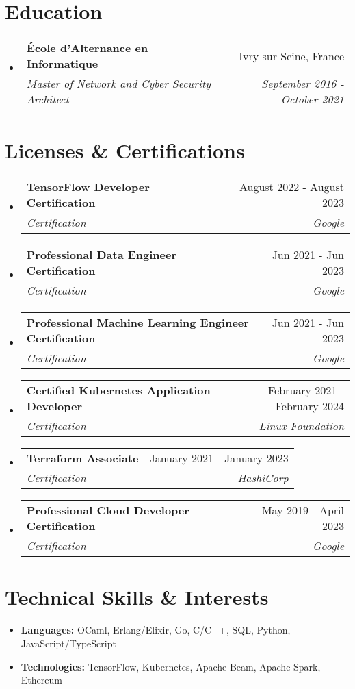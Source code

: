 \documentclass[letterpaper,11pt]{article}
\makeatletter
\newcommand{\resumeItem}[1]{
  \item\small{#1 \vspace{-2pt}}
}
\newcommand{\resumeSubheading}[4]{
  \vspace{-1pt}\item
    \begin{tabular*}{0.97\textwidth}[t]{l@{\extracolsep{\fill}}r}
      \textbf{#1} & #2 \\
      \textit{\small#3} & \textit{\small #4} \\
    \end{tabular*}\vspace{-5pt}
}
\newcommand{\resumeSubHeadingListStart}{\begin{itemize}[leftmargin=*]}
\newcommand{\resumeSubHeadingListEnd}{\end{itemize}}
\makeatother
\begin{document}
\section{Education}
\resumeSubHeadingListStart{}
\resumeSubheading{École d'Alternance en Informatique}
{Ivry-sur-Seine, France}
{Master of Network and Cyber Security Architect}
{September 2016 - October 2021}
\resumeSubHeadingListEnd{}


\section{Licenses \& Certifications}
\resumeSubHeadingListStart{}
\resumeSubheading{TensorFlow Developer Certification}
{August 2022 - August 2023}
{Certification}
{Google}
\resumeSubheading{Professional Data Engineer Certification}
{Jun 2021 - Jun 2023}
{Certification}
{Google}
\resumeSubheading{Professional Machine Learning Engineer Certification}
{Jun 2021 - Jun 2023}
{Certification}
{Google}
\resumeSubheading{Certified Kubernetes Application Developer}
{February 2021 - February 2024}
{Certification}
{Linux Foundation}
\resumeSubheading{Terraform Associate}
{January 2021 - January 2023}
{Certification}
{HashiCorp}
\resumeSubheading{Professional Cloud Developer Certification}
{May 2019 - April 2023}
{Certification}
{Google}
\resumeSubHeadingListEnd{}

\section{Technical Skills \& Interests}
\resumeSubHeadingListStart{}
\resumeItem{
  \textbf{Languages:}{
    OCaml, Erlang/Elixir, Go, C/C++, SQL, Python, JavaScript/TypeScript
  }
}
\resumeItem{
  \textbf{Technologies:}{
    TensorFlow, Kubernetes, Apache Beam, Apache Spark, Ethereum
  }
}
\resumeSubHeadingListEnd{}
\end{document}

